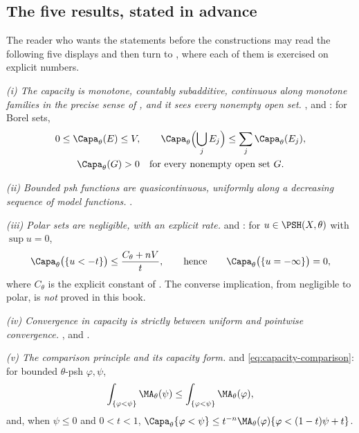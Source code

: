 \subsection{The five results, stated in advance}
\label{sec:ch25-payoff}

The reader who wants the statements before the constructions may read the
following five displays and then turn to , where each
of them is exercised on explicit numbers.

\emph{(i) The capacity is monotone, countably subadditive, continuous along
monotone families in the precise sense of
, and it sees every nonempty open set.}
,
 and :
for Borel sets,
\[
 \begin{gathered}
 0\leq\Capa_\theta(E)\leq V,
 \qquad
 \Capa_\theta\Bigl(\bigcup_j E_j\Bigr)\leq\sum_j\Capa_\theta(E_j),\\
 \Capa_\theta(G)>0\quad\text{for every nonempty open set }G.
 \end{gathered}
\]

\emph{(ii) Bounded psh functions are quasicontinuous, uniformly along a
decreasing sequence of model functions.}
.

\emph{(iii) Polar sets are negligible, with an explicit rate.}
 and
: for \(u\in\PSH(X,\theta)\) with
\(\sup u=0\),
\[
 \Capa_\theta\bigl(\{u<-t\}\bigr)\leq\frac{C_\theta+nV}{t},
 \qquad\text{hence}\qquad
 \Capa_\theta\bigl(\{u=-\infty\}\bigr)=0 ,
\]
where \(C_\theta\) is the explicit constant of
.  The converse implication, from negligible
to polar, is \emph{not} proved in this book.

\emph{(iv) Convergence in capacity is strictly between uniform and pointwise
convergence.}  ,
 and
.

\emph{(v) The comparison principle and its capacity form.}
 and
\eqref{eq:capacity-comparison}: for bounded \(\theta\)-psh
\(\varphi,\psi\),
\[
 \int_{\{\varphi<\psi\}}\MA_\theta(\psi)
 \leq\int_{\{\varphi<\psi\}}\MA_\theta(\varphi),
\]
and, when \(\psi\leq0\) and \(0<t<1\),
\(\Capa_\theta\{\varphi<\psi\}
 \leq t^{-n}\MA_\theta(\varphi)\{\varphi<(1-t)\psi+t\}\).

